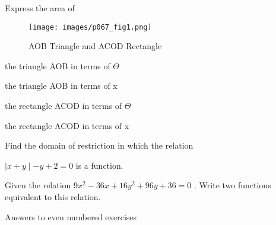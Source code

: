 \documentclass[11pt]{amsbook}
\begin{document}
\begin{hQuestion} {Express the area of }

\begin{figure}[h]
\center
\texttt{[image: images/p067\_fig1.png]}
\caption{ AOB Triangle and ACOD Rectangle}
\label{fig:p067_fig1}
 
\end{figure}

\begin{hEnumerateRoman}

  \item the triangle AOB in terms of $\Theta$
  \item the triangle AOB in terms of x
  \item the rectangle ACOD in terms of $\Theta$
  \item the rectangle ACOD in terms of x

\end{hEnumerateRoman} 

\end{hQuestion}


\begin{hQuestion} {Find the domain of restriction in which the relation}

	$\mid x + y \mid - y + 2  = 0 $ is a function. 

\end{hQuestion}


\begin{hQuestion} {Given the relation $9x^2 - 36x +16y^2 +96y+36 =0$ .}
	Write two functions equivalent to this relation.
\end{hQuestion}
Answers to even numbered exercises
\end{document}

